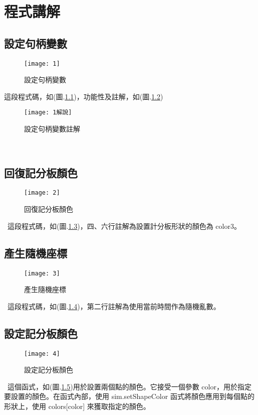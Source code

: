 \newpage
\chapter{程式講解}
\section{設定句柄變數}
\begin{figure}[hbt!]
\begin{center}
\texttt{[image: 1]}
\caption{\Large 設定句柄變數}\label{設定句柄變數}
\end{center}
\end{figure} 
這段程式碼，如(圖.\ref{設定句柄變數})，功能性及註解，如(圖.\ref{設定句柄變數註解})\
\begin{figure}[hhtbp!]
\begin{center}
\texttt{[image: 1解說]}
\caption{\Large 設定句柄變數註解}\label{設定句柄變數註解}
\end{center}
\end{figure}
\
\newpage
\
\section{回復記分板顏色}
\begin{figure}[htbp!]
\begin{center}
\texttt{[image: 2]}
\caption{\Large 回復記分板顏色}\label{回復記分板顏色}
\end{center}
\end{figure} 
\
這段程式碼，如(圖.\ref{回復記分板顏色})，四、六行註解為設置計分板形狀的顏色為 color3。
\section{產生隨機座標}
\begin{figure}[htbp!]
\begin{center}
\texttt{[image: 3]}
\caption{\Large 產生隨機座標}\label{產生隨機座標}
\end{center}
\end{figure} 
\
這段程式碼，如(圖.\ref{產生隨機座標})，第二行註解為使用當前時間作為隨機亂數。
\section{設定記分板顏色}
\begin{figure}[htbp!]
\begin{center}
\texttt{[image: 4]}
\caption{\Large 設定記分板顏色}\label{設定記分板顏色}
\end{center}
\end{figure} 
\
這個函式，如(圖.\ref{設定記分板顏色})用於設置兩個點的顏色。它接受一個參數 color，用於指定要設置的顏色。在函式內部，使用 sim.setShapeColor 函式將顏色應用到每個點的形狀上，使用 colors[color] 來獲取指定的顏色。
